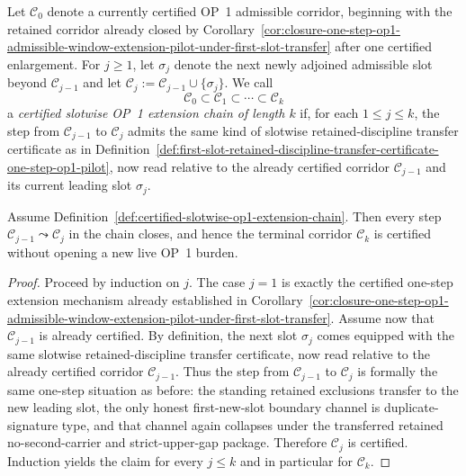 \begin{definition}
\label{def:certified-slotwise-op1-extension-chain}
Let $\mathcal C_0$ denote a currently certified OP~1 admissible corridor, beginning with the retained corridor already closed by Corollary~\ref{cor:closure-one-step-op1-admissible-window-extension-pilot-under-first-slot-transfer} after one certified enlargement. For $j\ge 1$, let $\sigma_j$ denote the next newly adjoined admissible slot beyond $\mathcal C_{j-1}$ and let $\mathcal C_j:=\mathcal C_{j-1}\cup\{\sigma_j\}$. We call
\[
  \mathcal C_0\subset \mathcal C_1\subset \cdots \subset \mathcal C_k
\]
a \emph{certified slotwise OP~1 extension chain of length $k$} if, for each $1\le j\le k$, the step from $\mathcal C_{j-1}$ to $\mathcal C_j$ admits the same kind of slotwise retained-discipline transfer certificate as in Definition~\ref{def:first-slot-retained-discipline-transfer-certificate-one-step-op1-pilot}, now read relative to the already certified corridor $\mathcal C_{j-1}$ and its current leading slot $\sigma_j$.
\end{definition}

\begin{proposition}
\label{prop:slotwise-transfer-certificates-iterate-one-step-op1-extension-mechanism}
Assume Definition~\ref{def:certified-slotwise-op1-extension-chain}. Then every step $\mathcal C_{j-1}\leadsto \mathcal C_j$ in the chain closes, and hence the terminal corridor $\mathcal C_k$ is certified without opening a new live OP~1 burden.
\end{proposition}

\begin{proof}
Proceed by induction on $j$. The case $j=1$ is exactly the certified one-step extension mechanism already established in Corollary~\ref{cor:closure-one-step-op1-admissible-window-extension-pilot-under-first-slot-transfer}. Assume now that $\mathcal C_{j-1}$ is already certified. By definition, the next slot $\sigma_j$ comes equipped with the same slotwise retained-discipline transfer certificate, now read relative to the already certified corridor $\mathcal C_{j-1}$. Thus the step from $\mathcal C_{j-1}$ to $\mathcal C_j$ is formally the same one-step situation as before: the standing retained exclusions transfer to the new leading slot, the only honest first-new-slot boundary channel is duplicate-signature type, and that channel again collapses under the transferred retained no-second-carrier and strict-upper-gap package. Therefore $\mathcal C_j$ is certified. Induction yields the claim for every $j\le k$ and in particular for $\mathcal C_k$.
\end{proof}

